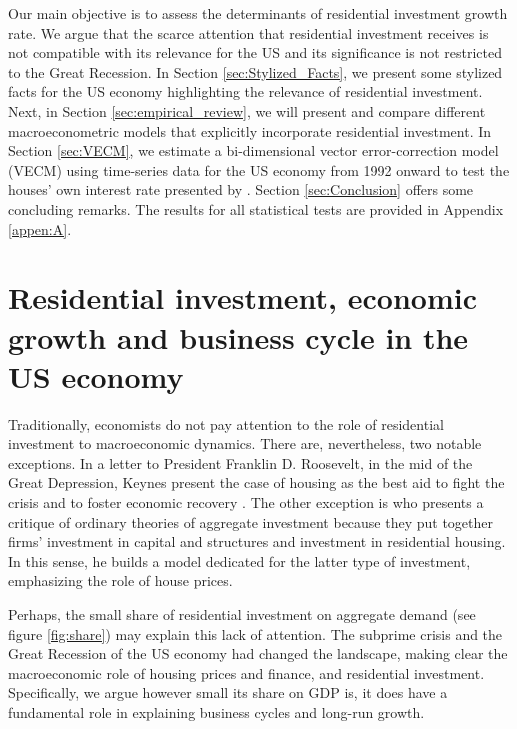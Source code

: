 \documentclass[12pt, a4paper]{article}
\begin{document}
Our main objective is to assess the determinants of residential investment growth rate.
We argue that the scarce attention that residential investment receives is not compatible with its relevance for the US and its significance is not restricted to the Great Recession.
In Section \ref{sec:Stylized_Facts}, we present some stylized facts for the US economy highlighting the relevance of residential investment.
Next, in Section \ref{sec:empirical_review}, we will present and compare different macroeconometric models that explicitly incorporate residential investment.
In Section \ref{sec:VECM}, we estimate a bi-dimensional vector error-correction model (VECM) using time-series data for the US economy from 1992 onward to test the houses' own interest rate presented by \textcite{teixeira_crescimento_2015}. 
Section \ref{sec:Conclusion} offers some concluding remarks.
The results for all statistical tests are provided in Appendix \ref{appen:A}.



\section{Residential investment, economic growth and business cycle in the US economy}
\label{sec:orgbaff481}
\label{sec:Stylized_Facts}
Traditionally, economists do not pay attention to the role of residential investment to macroeconomic dynamics.
There are, nevertheless, two notable exceptions.
In a letter to President Franklin D. Roosevelt, in the mid of the Great Depression, Keynes present the case of housing as the best aid to fight the crisis and to foster economic recovery \cite[p.~436]{keynes_collected_1978}.
The other exception is \textcite{duesenberry_investment_1958} who presents a critique of ordinary theories of aggregate investment because they put together firms’ investment in capital and structures and investment in residential housing.
In this sense, he builds a model dedicated for the latter type of investment, emphasizing the role of house prices.

Perhaps, the small share of residential investment on aggregate demand (see figure \ref{fig:share}) may explain this lack of attention.
The subprime crisis and the Great Recession of the US economy had changed the landscape, making clear the macroeconomic role of
housing prices and finance, and residential investment.
Specifically, we argue however small its share on GDP is, it does have a fundamental role in explaining business cycles and long-run growth.
\end{document}
